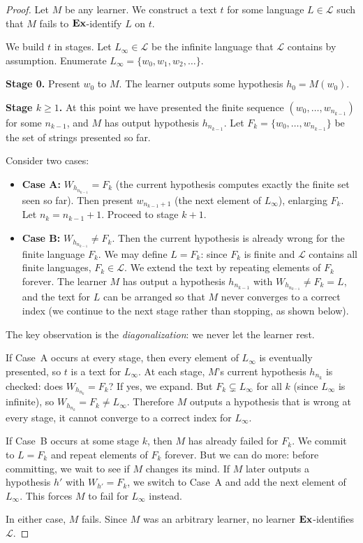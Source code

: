 \begin{proof}
Let $M$ be any learner. We construct a text $t$ for some language $L \in \mathcal{L}$ such that $M$ fails to $\mathbf{Ex}$-identify $L$ on $t$.

We build $t$ in stages. Let $L_\infty \in \mathcal{L}$ be the infinite language that $\mathcal{L}$ contains by assumption. Enumerate $L_\infty = \{w_0, w_1, w_2, \ldots\}$.

\medskip
\noindent\textbf{Stage 0.} Present $w_0$ to $M$. The learner outputs some hypothesis $h_0 = M(w_0)$.

\medskip
\noindent\textbf{Stage $k \geq 1$.} At this point we have presented the finite sequence $(w_0, \ldots, w_{n_{k-1}})$ for some $n_{k-1}$, and $M$ has output hypothesis $h_{n_{k-1}}$. Let $F_k = \{w_0, \ldots, w_{n_{k-1}}\}$ be the set of strings presented so far.

Consider two cases:
\begin{itemize}[leftmargin=*]
\item \textbf{Case A:} $W_{h_{n_{k-1}}} = F_k$ (the current hypothesis computes exactly the finite set seen so far). Then present $w_{n_{k-1}+1}$ (the next element of $L_\infty$), enlarging $F_k$. Let $n_k = n_{k-1} + 1$. Proceed to stage $k+1$.

\item \textbf{Case B:} $W_{h_{n_{k-1}}} \neq F_k$. Then the current hypothesis is already wrong for the finite language $F_k$. We may define $L = F_k$: since $F_k$ is finite and $\mathcal{L}$ contains all finite languages, $F_k \in \mathcal{L}$. We extend the text by repeating elements of $F_k$ forever. The learner $M$ has output a hypothesis $h_{n_{k-1}}$ with $W_{h_{n_{k-1}}} \neq F_k = L$, and the text for $L$ can be arranged so that $M$ never converges to a correct index (we continue to the next stage rather than stopping, as shown below).
\end{itemize}

The key observation is the \emph{diagonalization}: we never let the learner rest.

If Case~A occurs at every stage, then every element of $L_\infty$ is eventually presented, so $t$ is a text for $L_\infty$. At each stage, $M$'s current hypothesis $h_{n_k}$ is checked: does $W_{h_{n_k}} = F_k$? If yes, we expand. But $F_k \subsetneq L_\infty$ for all $k$ (since $L_\infty$ is infinite), so $W_{h_{n_k}} = F_k \neq L_\infty$. Therefore $M$ outputs a hypothesis that is wrong at every stage, it cannot converge to a correct index for $L_\infty$.

If Case~B occurs at some stage $k$, then $M$ has already failed for $F_k$. We commit to $L = F_k$ and repeat elements of $F_k$ forever. But we can do more: before committing, we wait to see if $M$ changes its mind. If $M$ later outputs a hypothesis $h'$ with $W_{h'} = F_k$, we switch to Case~A and add the next element of $L_\infty$. This forces $M$ to fail for $L_\infty$ instead.

In either case, $M$ fails. Since $M$ was an arbitrary learner, no learner $\mathbf{Ex}$-identifies $\mathcal{L}$.
\end{proof}

